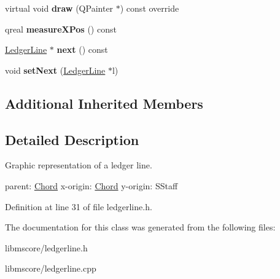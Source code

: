 \begin{DoxyCompactItemize}
virtual void {\bfseries draw} (Q\+Painter $\ast$) const override
\item 
\mbox{\label{class_ms_1_1_ledger_line_a89c846b36d635995b5aeb27fbc289fae}} 
qreal {\bfseries measure\+X\+Pos} () const
\item 
\mbox{\label{class_ms_1_1_ledger_line_a8ef8a7098d17bc07ee5a8d06ec81270d}} 
\hyperlink{class_ms_1_1_ledger_line}{Ledger\+Line} $\ast$ {\bfseries next} () const
\item 
\mbox{\label{class_ms_1_1_ledger_line_a6784a680197432e2cb49ea50eba790cf}} 
void {\bfseries set\+Next} (\hyperlink{class_ms_1_1_ledger_line}{Ledger\+Line} $\ast$l)
\end{DoxyCompactItemize}
\subsection*{Additional Inherited Members}


\subsection{Detailed Description}
Graphic representation of a ledger line.

parent\+: \hyperlink{class_ms_1_1_chord}{Chord} x-\/origin\+: \hyperlink{class_ms_1_1_chord}{Chord} y-\/origin\+: S\+Staff 

Definition at line 31 of file ledgerline.\+h.



The documentation for this class was generated from the following files\+:\begin{DoxyCompactItemize}
\item 
libmscore/ledgerline.\+h\item 
libmscore/ledgerline.\+cpp\end{DoxyCompactItemize}
